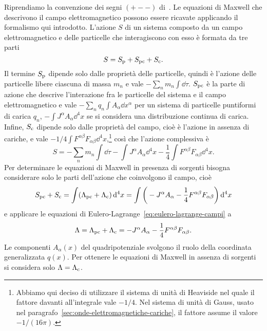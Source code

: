 Riprendiamo la convenzione dei segni $(+--)$ di~\textcite{weinberg:gravitation}.
Le equazioni di Maxwell che descrivono il campo
elettromagnetico possono essere ricavate applicando il formalismo qui
introdotto.  L'azione $S$ di un sistema
composto da un campo elettromagnetico e delle particelle che interagiscono con
esso è formata da tre parti
\begin{equation}
  S = S_{\textup{p}} + S_{\textup{pc}} + S_{\textup{c}}.
\end{equation}
Il termine $S_{\textup{p}}$ dipende solo dalle proprietà delle particelle,
quindi è l'azione delle particelle libere ciascuna di massa $m_{n}$ e vale
$-\sum_{n} m_{n}\int\dd \tau$.  $S_{\textup{pc}}$ è la parte di azione che
descrive l'interazione fra le particelle del sistema e il campo elettromagnetico
e vale $-\sum_{n} q_{n}\int A_{\alpha}\dd x^{\alpha}$ per un sistema di
particelle puntiformi di carica $q_{n}$, $-\int J^{\alpha}A_{\alpha}\dd^{4} x$
se si considera una distribuzione continua di carica.  Infine, $S_{\textup{c}}$
dipende solo dalle proprietà del campo, cioè è l'azione in assenza di cariche, e
vale $-1/4 \int F^{\alpha\beta}F_{\alpha\beta}\dd^{4}
x$,\footnote{Abbiamo
  qui deciso di utilizzare il sistema di unità di Heaviside nel quale il fattore
  davanti all'integrale vale $-1/4$.  Nel sistema di unità di Gauss, usato nel
  paragrafo~\ref{sec:onde-elettromagnetiche-cariche}, il fattore assume il
  valore $-1/(16\pi)$.}  così che l'azione complessiva è
\begin{equation}
  S = -\sum_{n} m_{n}\int \dd\tau - \int J^{\alpha}A_{\alpha} \dd^{4} x
  -\frac{1}{4} \int F^{\alpha\beta}F_{\alpha\beta} \dd^{4} x.
\end{equation}
Per determinare le equazioni di Maxwell in presenza
di sorgenti bisogna considerare solo le parti dell'azione che coinvolgono il
campo, cioè
\begin{equation}
  S_{\textup{pc}} + S_{\textup{c}} =  \int (\Lambda_{\textup{pc}} +
  \Lambda_{\textup{c}}) \mathop{}\!\mathrm{d}^{4} x = \int \bigg( -J^{\alpha}A_{\alpha}
  -\frac{1}{4} F^{\alpha\beta}F_{\alpha\beta} \bigg) \mathop{}\!\mathrm{d}^{4} x
\end{equation}
e applicare le equazioni di Eulero-Lagrange~\eqref{eq:eulero-lagrange-campi} a
\begin{equation}
  \Lambda = \Lambda_{\textup{pc}} + \Lambda_{\textup{c}} = -J^{\alpha}A_{\alpha}
  -\frac{1}{4} F^{\alpha\beta}F_{\alpha\beta}.
\end{equation}
Le componenti $A_{\alpha}(x)$ del quadripotenziale svolgono il ruolo della
coordinata generalizzata $q(x)$.  Per ottenere le equazioni di Maxwell
 in assenza di sorgenti si considera solo $\Lambda =
\Lambda_{\textup{c}}$.

